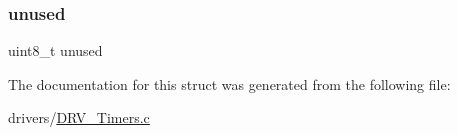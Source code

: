 \mbox{\label{structtimer__t_af3138032961911b5742b4344e37f43d4}} 
\subsubsection{\texorpdfstring{unused}{unused}}
{\footnotesize\ttfamily uint8\+\_\+t unused}



The documentation for this struct was generated from the following file\+:\begin{DoxyCompactItemize}
\item 
drivers/\mbox{\hyperlink{_d_r_v___timers_8c}{D\+R\+V\+\_\+\+Timers.\+c}}\end{DoxyCompactItemize}

